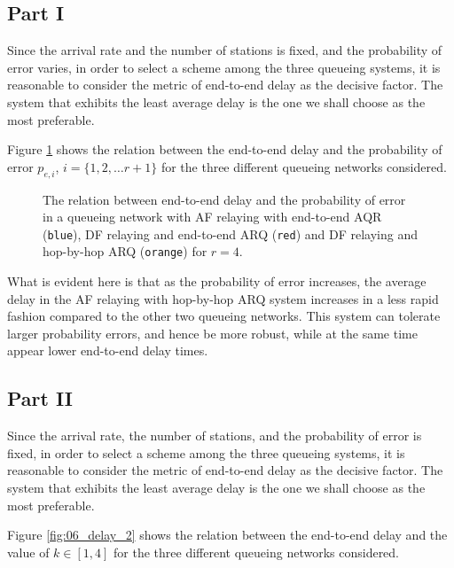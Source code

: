 \subsection{Part I}

Since the arrival rate and the number of stations is fixed, and the probability
of error varies, in order to select a scheme among the three queueing systems,
it is reasonable to consider the metric of end-to-end delay as the decisive
factor. The system that exhibits the least average delay is the one we shall
choose as the most preferable.

Figure \ref{fig:06_delay_1} shows the relation between the end-to-end delay
and the probability of error $p_{e,i}$, $i = \{1,2, \dots r+1\}$ for the three
different queueing networks considered.

\begin{figure}[H]\centering
  
  \caption{The relation between end-to-end delay and the probability of error
    in a queueing network with AF relaying with end-to-end AQR (\texttt{blue}),
    DF relaying and end-to-end ARQ (\texttt{red}) and
    DF relaying and hop-by-hop ARQ (\texttt{orange}) for $r=4$.}
  \label{fig:06_delay_1}
\end{figure}

What is evident here is that as the probability of error increases, the average
delay in the AF relaying with hop-by-hop ARQ system increases in a less rapid
fashion compared to the other two queueing networks. This system can tolerate
larger probability errors, and hence be more robust, while at the same time
appear lower end-to-end delay times.


\subsection{Part II}

Since the arrival rate, the number of stations, and the probability of error is
fixed, in order to select a scheme among the three queueing systems,
it is reasonable to consider the metric of end-to-end delay as the decisive
factor. The system that exhibits the least average delay is the one we shall
choose as the most preferable.

Figure \ref{fig:06_delay_2} shows the relation between the end-to-end delay
and the value of $k \in [1,4]$ for the three different queueing networks
considered.

